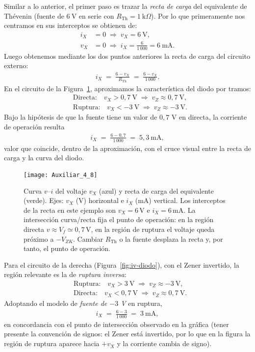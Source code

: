 \documentclass[
  11pt,
  letterpaper,
   addpoints,
   answers
  ]{exam}
\begin{document}
\begin{questions}
\begin{solution}
Similar a lo anterior, el primer paso es trazar la \emph{recta de carga} del equivalente de Thévenin (fuente de $6~\text{V}$ en serie con $R_{\text{Th}}=1~\text{k}\Omega$). Por lo que primeramente nos centramos en sus interceptos se obtienen de:
\begin{align}
i_X&=0 \;\Rightarrow\; v_X=6~\text{V},\\
v_X&=0 \;\Rightarrow\; i_X=\frac{6}{1\,000}=6~\text{mA}.
\end{align}
Luego obtenemos mediante los dos puntos anteriores la recta de carga del circuito externo:
\begin{align}
i_X \;=\; \frac{6-v_X}{R_{\text{Th}}}
\;=\; \frac{6-v_X}{1\,000}.
\end{align}
En el circuito de la Figura~\ref{fig:carac-v-i}, aproximamos la característica del diodo por tramos:
\begin{align*}
&\text{Directa:}\quad v_X>0{,}7~\text{V}\;\Rightarrow\; v_Z \approx 0{,}7~\text{V},\\
&\text{Ruptura:}\quad v_X<-3~\text{V}\;\Rightarrow\; v_Z \approx -3~\text{V}.
\end{align*}
Bajo la hipótesis de que la fuente tiene un valor de  $0{,}7$ V en directa, la corriente de operación resulta 
\begin{align}
i_X \;=\; \frac{6-0{,}7}{1\,000} \;=\; 5{,}3~\text{mA},
\end{align}
valor que coincide, dentro de la aproximación, con el cruce visual entre la recta de carga y la curva del diodo.

\begin{figure}[H]
  \centering
  \texttt{[image: Auxiliar\_4\_8]}
  \caption{Curva $v$--$i$ del voltaje $v_X$ (azul) y recta de carga del equivalente (verde). Ejes: $v_X$ (V) horizontal e $i_X$ (mA) vertical. Los interceptos de la recta en este ejemplo son $v_X=6\,$V e $i_X=6\,$mA. La intersección curva/recta fija el punto de operación: en la región directa $v\approx V_f\simeq0{,}7\,$V, en la región de ruptura el voltaje queda próximo a $-V_{ZK}$. Cambiar $R_{\text{Th}}$ o la fuente desplaza la recta y, por tanto, el punto de operación.}
  \label{fig:carac-v-i}
\end{figure}


Para el circuito de la derecha (Figura~\ref{fig:iv-diodo}), con el Zener invertido, la región relevante es la de \emph{ruptura inversa}:
\begin{align*}
&\text{Ruptura:}\quad v_X>3~\text{V}\;\Rightarrow\; v_Z \approx -3~\text{V},\\
&\text{Directa:}\quad v_X<0{,}7~\text{V}\;\Rightarrow\; v_Z \approx 0{,}7~\text{V}.
\end{align*}
Adoptando el modelo de \emph{fuente de \(-3\) V} en ruptura,
\begin{align}
i_X \;=\; \frac{6-3}{1\,000} \;=\; 3~\text{mA},
\end{align}
en concordancia con el punto de intersección observado en la gráfica (tener presente la convención de signos: el Zener está invertido, por lo que en la figura la región de ruptura aparece hacia $+v_X$ y la corriente cambia de signo).


\end{solution}
\end{questions}
\end{document}

